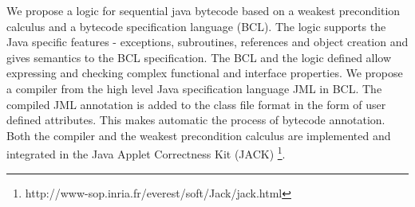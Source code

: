 We propose a logic for sequential java bytecode based on a weakest precondition calculus and a bytecode specification language (BCL). 
The logic supports the Java specific features - exceptions, subroutines, references and object creation and gives semantics to the BCL specification. The BCL and the logic defined  allow expressing and checking complex functional and interface properties. We propose a compiler from the high level Java specification language JML in BCL. The compiled JML annotation is added to the class file format in the form of user defined attributes. This makes automatic the process of bytecode annotation.  Both the compiler and the weakest precondition calculus are implemented and integrated in the Java Applet Correctness Kit (JACK) \footnote{http://www-sop.inria.fr/everest/soft/Jack/jack.html}.


